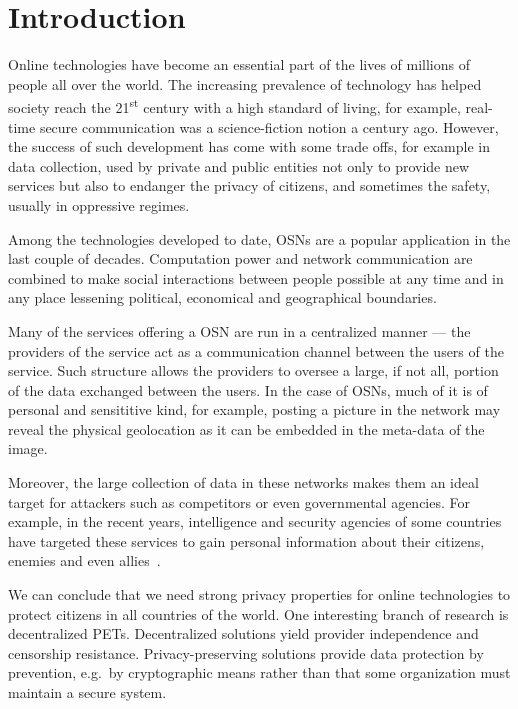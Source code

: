 \section{Introduction}
\label{Introduction}

Online technologies have become an essential part of the lives of millions of people 
all over the world. The increasing prevalence of technology has helped society reach 
the 21\textsuperscript{st} century with a high standard of living, for example, real-time 
secure communication was a science-fiction notion a century ago. However, the success 
of such development has come with some trade offs, for example in data collection, 
used by private and public entities not only to provide new services but also to 
endanger the privacy of citizens, and sometimes the safety, usually in oppressive 
regimes.

Among the technologies developed to date, \acp{OSN} are a popular application in 
the last couple of decades. Computation power and network communication are combined 
to make social interactions between people possible at any time and in any place 
lessening political, economical and geographical boundaries.

Many of the services 
offering a \ac{OSN} are run in a centralized manner --- the providers of the service 
act as a communication channel between the users of the service. Such structure 
allows the providers to oversee a large, if not all, portion of the data exchanged 
between the users. In the case of \acp{OSN}, much of it is of personal and sensititive 
kind, for example, posting a picture in the network may reveal the physical geolocation 
as it can be embedded in the meta-data of the image.

Moreover, the large collection of data in these networks makes them an ideal target 
for attackers such as competitors or even governmental agencies. For example, in 
the recent years, intelligence and security agencies of some countries have targeted 
these services to gain personal information about their citizens, enemies and even 
allies~\cite{Prism}.

We can conclude that we need strong privacy properties for online technologies 
to protect citizens in all countries of the world.
One interesting branch of research is decentralized \acp{PET}.
Decentralized solutions yield provider independence and censorship resistance.
Privacy-preserving solutions provide data protection by prevention, e.g.\ by 
cryptographic means rather than that some organization must maintain a secure 
system.

